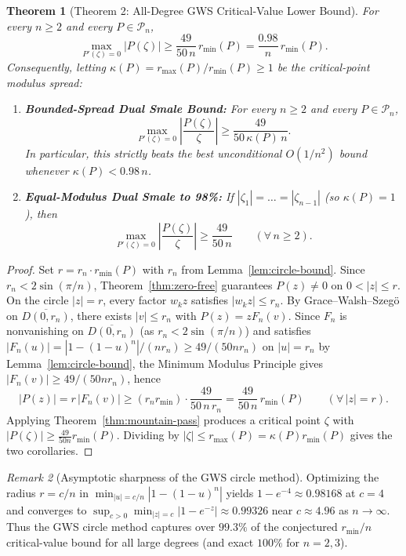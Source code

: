 \documentclass[11pt,a4paper]{article}
\newtheorem{theorem}{Theorem}[section]
\theoremstyle{definition}
\theoremstyle{remark}
\newtheorem{remark}[theorem]{Remark}
\begin{document}
\begin{theorem}[Theorem 2: All-Degree GWS Critical-Value Lower Bound]
\label{thm:gws-critval}
For every $n \ge 2$ and every $P \in \mathcal{P}_n$,
\[
\max_{P'(\zeta) = 0} |P(\zeta)| \ge \frac{49}{50\,n}\, r_{\min}(P) = \frac{0.98}{n}\, r_{\min}(P).
\]
Consequently, letting $\kappa(P) = r_{\max}(P)/r_{\min}(P) \ge 1$ be the critical-point modulus spread:
\begin{enumerate}
\item \textbf{Bounded-Spread Dual Smale Bound:} For every $n \ge 2$ and every $P \in \mathcal{P}_n$,
\[
\max_{P'(\zeta) = 0} \left|\frac{P(\zeta)}{\zeta}\right| \ge \frac{49}{50\,\kappa(P)\,n}.
\]
In particular, this strictly beats the best unconditional $O(1/n^2)$ bound~\cite{JatarNg2026} whenever $\kappa(P) < 0.98\,n$.
\item \textbf{Equal-Modulus Dual Smale to 98\%:} If $|\zeta_1| = \dots = |\zeta_{n-1}|$ (so $\kappa(P) = 1$), then
\[
\max_{P'(\zeta) = 0} \left|\frac{P(\zeta)}{\zeta}\right| \ge \frac{49}{50\,n} \qquad (\forall\, n \ge 2).
\]
\end{enumerate}
\end{theorem}

\begin{proof}
Set $r = r_n \cdot r_{\min}(P)$ with $r_n$ from Lemma~\ref{lem:circle-bound}. Since $r_n < 2\sin(\pi/n)$, Theorem~\ref{thm:zero-free} guarantees $P(z) \neq 0$ on $0 < |z| \le r$.
On the circle $|z| = r$, every factor $w_k z$ satisfies $|w_k z| \le r_n$. By Grace--Walsh--Szeg\"o on $\overline{D(0, r_n)}$, there exists $|v| \le r_n$ with $P(z) = z F_n(v)$. Since $F_n$ is nonvanishing on $\overline{D(0, r_n)}$ (as $r_n < 2\sin(\pi/n)$) and satisfies $|F_n(u)| = |1 - (1 - u)^n|/(n r_n) \ge 49/(50 n r_n)$ on $|u| = r_n$ by Lemma~\ref{lem:circle-bound}, the Minimum Modulus Principle gives $|F_n(v)| \ge 49/(50 n r_n)$, hence
\[
|P(z)| = r\, |F_n(v)| \ge (r_n r_{\min}) \cdot \frac{49}{50\,n\,r_n} = \frac{49}{50\,n}\, r_{\min}(P) \qquad (\forall\, |z| = r).
\]
Applying Theorem~\ref{thm:mountain-pass} produces a critical point $\zeta$ with $|P(\zeta)| \ge \frac{49}{50n} r_{\min}(P)$. Dividing by $|\zeta| \le r_{\max}(P) = \kappa(P) r_{\min}(P)$ gives the two corollaries.
\end{proof}

\begin{remark}[Asymptotic sharpness of the GWS circle method]
Optimizing the radius $r = c/n$ in $\min_{|u| = c/n} |1 - (1 - u)^n|$ yields $1 - e^{-4} \approx 0.98168$ at $c = 4$ and converges to $\sup_{c > 0} \min_{|z|=c} |1 - e^{-z}| \approx 0.99326$ near $c \approx 4.96$ as $n \to \infty$. Thus the GWS circle method captures over $99.3\%$ of the conjectured $r_{\min}/n$ critical-value bound for all large degrees (and exact $100\%$ for $n = 2, 3$).
\end{remark}
\end{document}
